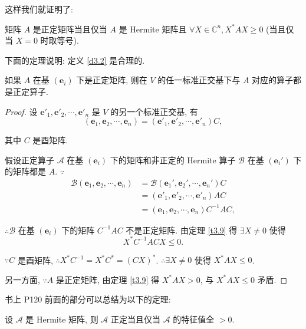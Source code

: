 \documentclass[color=black,device=normal,lang=cn,mode=geye]{elegantnote}
\begin{document}
这样我们就证明了:
\begin{theorem}\label{t3.9}
    矩阵 $A$ 是正定矩阵当且仅当 $A$ 是 Hermite 矩阵且 $\forall X\in\mathbb{C}^n,X^*AX\geq0$ (当且仅当 $X=0$ 时取等号).
\end{theorem}
下面的定理说明: 定义 \ref{d3.2} 是合理的.
\begin{theorem}\label{t3.10}
    如果 $A$ 在基 $(\boldsymbol{e}_i)$ 下是正定矩阵, 则在 $V$ 的任一标准正交基下与 $A$ 对应的算子都是正定算子.
\end{theorem}
\begin{proof}
    设 $\boldsymbol{e}'_1,\boldsymbol{e}'_2,\cdots,\boldsymbol{e}'_n$ 是 $V$ 的另一个标准正交基, 有
    \[(\boldsymbol{e}_1,\boldsymbol{e}_2,\cdots,\boldsymbol{e}_n)=(\boldsymbol{e}'_1,\boldsymbol{e}'_2,\cdots,\boldsymbol{e}'_n)C,\]

    其中 $C$ 是酉矩阵.

    假设正定算子 $\mathcal{A}$ 在基 $(\boldsymbol{e}_i)$ 下的矩阵和非正定的 Hermite 算子 $\mathcal{B}$ 在基 $(\boldsymbol{e}_i')$ 下的矩阵都是 $A$. $\because$
    \begin{align*}
        \mathcal{B}(\boldsymbol{e}_1,\boldsymbol{e}_2,\cdots,\boldsymbol{e}_n) & =\mathcal{B}(\boldsymbol{e}_1',\boldsymbol{e}_2',\cdots,\boldsymbol{e}_n')C \\
        & =(\boldsymbol{e}'_1,\boldsymbol{e}'_2,\cdots,\boldsymbol{e}'_n)AC \\
        & =(\boldsymbol{e}_1,\boldsymbol{e}_2,\cdots,\boldsymbol{e}_n)C^{-1}AC,
    \end{align*}

    $\therefore\mathcal{B}$ 在基 $(\boldsymbol{e}_i)$ 下的矩阵 $C^{-1}AC$ 不是正定矩阵. 由定理 \ref{t3.9} 得 $\exists X\neq0$ 使得
    \[X^*C^{-1}ACX\leq0.\]

    $\because C$ 是酉矩阵, $\therefore X^*C^{-1}=X^*C^*=(CX)^*$. $\therefore\exists X\neq0$ 使得 $X^*AX\leq0$.

    另一方面, $\because A$ 是正定矩阵, 由定理 \ref{t3.9} 得 $X^*AX>0$, 与 $X^*AX\leq0$ 矛盾.
\end{proof}
书上 P120 前面的部分可以总结为以下的定理:
\begin{theorem}\label{t3.11}
    设 $\mathcal{A}$ 是 Hermite 矩阵, 则 $\mathcal{A}$ 正定当且仅当 $\mathcal{A}$ 的特征值全 $>0$.
\end{theorem}
\end{document}
